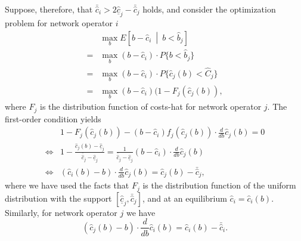 Suppose, therefore, that $\bar{\hat{c}}_i > 2\underline{\hat{c}}_j - \bar{\hat{c}}_j$ holds, and consider the optimization problem for network operator $i$
\begin{align*}
  &\max_{b} E \left[ b - \hat{c}_i \:\middle\vert\: b < \hat{b}_j \right]\\
  = &\max_{b} (b - \hat{c}_i)\cdot P\{b < \hat{b}_j\}\\
  = &\max_{b} (b - \hat{c}_i)\cdot P\{\hat{c}_j(b) < \hat{C}_j\}\\
  = &\max_{b} (b - \hat{c}_i)(1 - F_j(\hat{c}_j(b)),
\end{align*}
where $F_j$ is the distribution function of costs-hat for network operator $j$. The first-order condition yields
\begin{align}
  &1 - F_j(\hat{c}_j(b)) - (b - \hat{c}_i)f_j(\hat{c}_j(b))\cdot\frac{d}{db}\hat{c}_j(b) = 0 \nonumber \\
  \iff &1 - \frac{\hat{c}_j(b) - \underline{\hat{c}}_j}{\bar{\hat{c}}_j - \underline{\hat{c}}_j} = \frac{1}{\bar{\hat{c}}_j - \underline{\hat{c}}_j}(b - \hat{c}_i)\cdot\frac{d}{db}\hat{c}_j(b) \nonumber \\
  \iff &(\hat{c}_i(b) - b)\cdot\frac{d}{db}\hat{c}_j(b) = \hat{c}_j(b) - \bar{\hat{c}}_j,
  \label{eq:first_order_bidder_i_indirect}
\end{align}
where we have used the facts that $F_j$ is the distribution function of the uniform distribution with the support $[\underline{\hat{c}}_j, \bar{\hat{c}}_j]$, and at an equilibrium $\hat{c}_i = \hat{c}_i(b)$. Similarly, for network operator $j$ we have
\begin{equation}
  \label{eq:first_order_bidder_j_indirect}
  (\hat{c}_j(b) - b)\cdot\frac{d}{db}\hat{c}_i(b) = \hat{c}_i(b) - \bar{\hat{c}}_i.
\end{equation}

